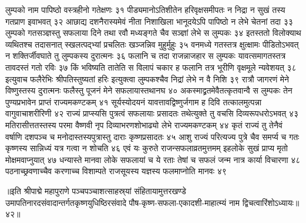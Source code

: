 लुम्पको नाम पापिष्ठो वस्त्रहीनो गतेक्षणः ३१
पीड्यमानोऽतिशीतेन हरिवृक्षसमीपतः 
न निद्रा न सुखं तस्य गतप्राण इवाभवत् ३२
आछाद्य दशनैरास्यमेवं नीता निशाखिला 
भानूदयेऽपि पापिष्ठो न लेभे चेतनां तदा ३३
लुम्पको गतसञ्ज्ञस्तु सफलाया दिने तथा 
रवौ मध्यङ्गते चैव सञ्ज्ञां लेभे स लुम्पकः ३४
इतस्ततो विलोक्याथ व्यथितश्च तदासनात् 
स्खलत्पद्भ्यां प्रचलितः खञ्जन्निव मुहुर्मुहुः ३५
वनमध्ये गतस्तत्र क्षुत्क्षामः पीडितोऽभवत् 
न शक्तिर्जीवघाते तु लुम्पकस्य दुरात्मनः ३६
फलानि च तदा राजन्नाजहार स लुम्पकः 
यावत्समागतस्तत्र तावदस्तं गतो रविः ३७
किं भविष्यति तातेति स विलापं चकार ह 
फलानि तत्र भूरीणि वृक्षमूले न्यवेशयत् ३८
इत्युवाच फलैरेभिः श्रीपतिस्तुष्यतां हरिः 
इत्युक्त्वा लुम्पकश्चैव निद्रां लेभे न वै निशि ३९
रात्रौ जागरणं मेने विष्णुस्तस्य दुरात्मनः 
फलैस्तु पूजनं मेने सफलायास्तथानघ ४०
अकस्माद्व्रतमेवैतत्कृतवान्वै  स लुम्पकः 
तेन पुण्यप्रभावेन प्राप्तं राज्यमकण्टकम् ४१
सूर्यस्योदयनं यावत्तावद्विष्णुर्जगाम ह 
दिवि तत्कालमुत्पन्ना वागुवाचाशरीरिणी ४२
राज्यं प्राप्स्यसि पुत्रत्वं सफलायाः प्रसादतः
तथेत्युक्ते तु वचसि दिव्यरूपधरोऽभवत् ४३
मतिरासीत्ततस्तस्य परमा वैष्णवी नृप 
दिव्याभरणशोभाढ्यो लेभे राज्यमकण्टकम् ४४
कृतं राज्यं तु तेनैवं वर्षाणि दशपञ्च च 
मनोदास्तस्यपुत्रास्तु दाराः कृष्णप्रसादतः ४५
आशु राज्यं परित्यज्य पुत्रे चैव समर्प्य च 
गतः कृष्णस्य सान्निध्यं यत्र गत्वा न शोचति ४६
एवं यः कुरुते राजन्सफलाव्रतमुत्तमम् 
इहलोके सुखं प्राप्य मृतो मोक्षमवाप्नुयात् ४७
धन्यास्ते मानवा लोके सफलायां च ये रताः 
तेषां च सफलं जन्म नात्र कार्या विचारणा ४८
पठनाच्छ्रवणाच्चैव करणाच्च विशाम्पते 
राजसूयस्य यज्ञस्य फलमाप्नोति मानवः ४९

॥इति श्रीपाद्मे महापुराणे पञ्चपञ्चाशत्साहस्र्यां संहितायामुत्तरखण्डे उमापतिनारदसंवादान्तर्गतकृष्णयुधिष्ठिरसंवादे पौष-कृष्ण-सफला-एकादशी-माहात्म्यं नाम द्विचत्वारिंशोऽध्यायः॥४२॥


